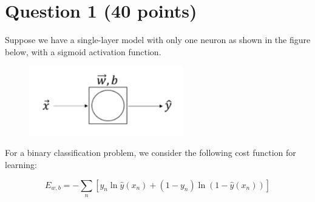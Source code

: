 \section{Question 1 (40 points)} 
Suppose we have a single-layer model with only one neuron as shown in the figure below, with a sigmoid activation function.

\begin{figure}[H]
    \centering
    \includegraphics[width=0.6\textwidth]{Q1_rep.png}
\end{figure}

For a binary classification problem, we consider the following cost function for learning:

\[
E_{w, b} = -\sum_n \left[ y_n \ln \hat{y}(x_n) + (1 - y_n) \ln (1 - \hat{y}(x_n)) \right]
\]

